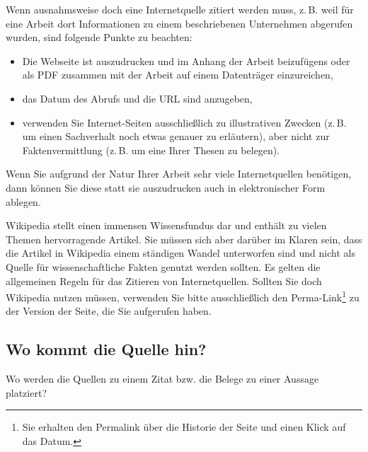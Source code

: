 \documentclass[conference,compsoc,final,a4paper]{IEEEtran}
\begin{document}
Wenn ausnahmsweise doch eine Internetquelle zitiert werden muss, z.\,B. weil für eine Arbeit dort Informationen zu einem beschriebenen Unternehmen abgerufen wurden, sind folgende Punkte zu beachten:

\begin{itemize}
\item Die Webseite ist auszudrucken und im Anhang der Arbeit beizufügens oder als PDF zusammen mit der Arbeit auf einem Datenträger einzureichen,
\item das Datum des Abrufs und die URL sind anzugeben,
\item verwenden Sie Internet-Seiten ausschließlich zu illustrativen Zwecken (z.\,B. um einen Sachverhalt noch etwas genauer zu erläutern), aber nicht zur Faktenvermittlung (z.\,B. um eine Ihrer Thesen zu belegen).
\end{itemize}

Wenn Sie aufgrund der Natur Ihrer Arbeit sehr viele Internetquellen benötigen, dann können Sie diese statt sie auszudrucken auch in elektronischer Form ablegen.

Wikipedia stellt einen immensen Wissensfundus dar und enthält zu vielen Themen hervorragende Artikel. Sie müssen sich aber darüber im Klaren sein, dass die Artikel in Wikipedia einem ständigen Wandel unterworfen sind und nicht als Quelle für wissenschaftliche Fakten genutzt werden sollten. Es gelten die allgemeinen Regeln für das Zitieren von Internetquellen. Sollten Sie doch Wikipedia nutzen müssen, verwenden Sie bitte ausschließlich den Perma-Link\footnote{Sie erhalten den Permalink über die Historie der Seite und einen Klick auf das Datum.} zu der Version der Seite, die Sie aufgerufen haben.

\subsection{Wo kommt die Quelle hin?}
Wo werden die Quellen zu einem Zitat bzw. die Belege zu einer Aussage platziert?
\end{document}
